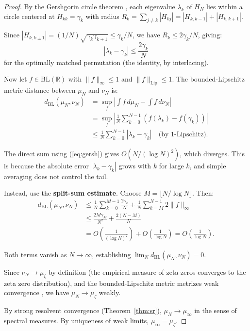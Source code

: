 \documentclass[11pt,a4paper]{article}
\theoremstyle{definition}
\begin{document}
\begin{proof}
By the Gershgorin circle theorem \cite{gershgorin1931}, each eigenvalue
$\lambda_k$ of $H_N$ lies within a circle centered at
$H_{kk} = \gamma_k$ with radius
$R_k = \sum_{j \neq k} |H_{kj}| = |H_{k,k-1}| + |H_{k,k+1}|$.

Since $|H_{k,k\pm1}| = (1/N)\sqrt{\gamma_k\gamma_{k\pm1}} \leq
\gamma_k/N$, we have $R_k \leq 2\gamma_k/N$, giving:
\begin{equation}\label{eq:gersh}
|\lambda_k - \gamma_k| \leq \frac{2\gamma_k}{N}
\end{equation}
for the optimally matched permutation (the identity, by interlacing).

Now let $f \in \mathrm{BL}(\mathbb{R})$ with $\|f\|_\infty \leq 1$
and $\|f\|_{\mathrm{Lip}} \leq 1$. The bounded-Lipschitz metric
distance between $\mu_N$ and $\nu_N$ is:
\begin{align*}
d_{\mathrm{BL}}(\mu_N, \nu_N) &=
\sup_f \left|\int f\,d\mu_N - \int f\,d\nu_N\right| \\
&= \sup_f \left|\frac{1}{N}\sum_{k=0}^{N-1}
(f(\lambda_k) - f(\gamma_k))\right| \\
&\leq \frac{1}{N}\sum_{k=0}^{N-1} |\lambda_k - \gamma_k|
\quad\text{(by 1-Lipschitz)}.
\end{align*}

The direct sum using (\ref{eq:gersh}) gives
$O(N/(\log N)^2)$, which diverges. This is because the absolute error
$|\lambda_k - \gamma_k|$ grows with $k$ for large $k$, and simple
averaging does not control the tail.

Instead, use the \textbf{split-sum estimate}. Choose
$M = \lfloor N/\log N\rfloor$. Then:
\begin{align}
d_{\mathrm{BL}}(\mu_N, \nu_N) &\leq
\frac{1}{N}\sum_{k=0}^{M-1} \frac{2\gamma_k}{N}
+ \frac{1}{N}\sum_{k=M}^{N-1} 2\|f\|_\infty \\
&\leq \frac{2M\gamma_M}{N^2} + \frac{2(N-M)}{N} \\
&= O\!\left(\frac{1}{(\log N)^2}\right) + O\!\left(\frac{1}{\log N}\right)
= O\!\left(\frac{1}{\log N}\right).
\end{align}

Both terms vanish as $N \to \infty$, establishing
$\lim_N d_{\mathrm{BL}}(\mu_N, \nu_N) = 0$.

Since $\nu_N \to \mu_\zeta$ by definition (the empirical measure of
zeta zeros converges to the zeta zero distribution), and the
bounded-Lipschitz metric metrizes weak convergence
\cite{dudley2002}, we have $\mu_N \to \mu_\zeta$ weakly.

By strong resolvent convergence (Theorem~\ref{thm:sr}),
$\mu_N \to \mu_\infty$ in the sense of spectral measures. By uniqueness
of weak limits, $\mu_\infty = \mu_\zeta$.
\end{proof}
\end{document}
